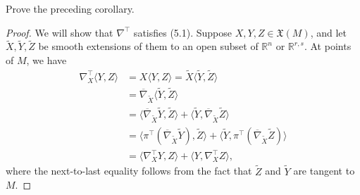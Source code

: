\begin{exercise}
\label{exer:prove-corollary-5-6}

Prove the preceding corollary.
\end{exercise}
\begin{proof}
We will show that $\nabla^{\top}$ satisfies (5.1). Suppose $X, Y, Z \in \mathfrak{X}(M)$, and let $\tilde{X}, \tilde{Y}, \tilde{Z}$ be smooth extensions of them to an open subset of $\mathbb{R}^n$ or $\mathbb{R}^{r,s}$. At points of $M$, we have
\begin{align*}
\nabla^{\top}_X \langle Y, Z \rangle &= X \langle Y, Z \rangle = \tilde{X} \langle \tilde{Y}, \tilde{Z} \rangle \\
&= \overline{\nabla}_{\tilde{X}} \langle \tilde{Y}, \tilde{Z} \rangle \\
&= \langle \overline{\nabla}_{\tilde{X}} \tilde{Y}, \tilde{Z} \rangle + \langle \tilde{Y}, \overline{\nabla}_{\tilde{X}} \tilde{Z} \rangle \\
&= \langle \pi^{\top} (\overline{\nabla}_{\tilde{X}} \tilde{Y}), \tilde{Z} \rangle + \langle \tilde{Y}, \pi^{\top} (\overline{\nabla}_{\tilde{X}} \tilde{Z}) \rangle \\
&= \langle \nabla^{\top}_X Y, Z \rangle + \langle Y, \nabla^{\top}_X Z \rangle,
\end{align*}
where the next-to-last equality follows from the fact that $\tilde{Z}$ and $\tilde{Y}$ are tangent to $M$.
\end{proof}

